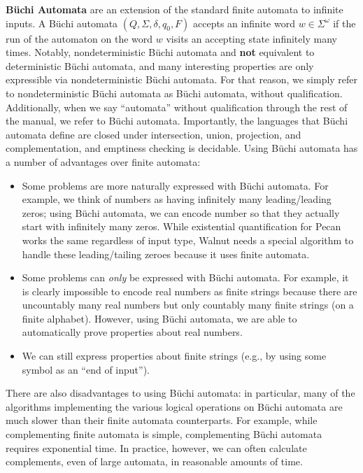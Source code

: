 \textbf{B\"uchi Automata} are an extension of the standard finite automata to infinite inputs.
A B\"uchi automata $(Q, \Sigma, \delta, q_0, F)$ accepts an infinite word $w \in \Sigma^\omega$ if the run of the automaton on the word $w$ visits an accepting state infinitely many times.
Notably, nondeterministic B\"uchi automata and \textbf{not} equivalent to deterministic B\"uchi automata, and many interesting properties are only expressible via nondeterministic B\"uchi automata.
For that reason, we simply refer to nondeterministic B\"uchi automata as B\"uchi automata, without qualification.
Additionally, when we say ``automata'' without qualification through the rest of the manual, we refer to B\"uchi automata.
Importantly, the languages that B\"uchi automata define are closed under intersection, union, projection, and complementation, and emptiness checking is decidable.
Using B\"uchi automata has a number of advantages over finite automata:
\begin{itemize}
        \item Some problems are more naturally expressed with B\"uchi automata.
            For example, we think of numbers as having infinitely many leading/leading zeros; using B\"uchi automata, we can encode number so that they actually start with infinitely many zeros.
            While existential quantification for Pecan works the same regardless of input type, Walnut needs a special algorithm to handle these leading/tailing zeroes because it uses finite automata.
            
        \item Some problems can \emph{only} be expressed with B\"uchi automata.
            For example, it is clearly impossible to encode real numbers as finite strings because there are uncountably many real numbers but only countably many finite strings (on a finite alphabet).
            However, using B\"uchi automata, we are able to automatically prove properties about real numbers.
        
        \item We can still express properties about finite strings (e.g., by using some symbol as an ``end of input'').
\end{itemize}

There are also disadvantages to using B\"uchi automata: in particular, many of the algorithms implementing the various logical operations on B\"uchi automata are much slower than their finite automata counterparts.
For example, while complementing finite automata is simple, complementing B\"uchi automata requires exponential time.
In practice, however, we can often calculate complements, even of large automata, in reasonable amounts of time.
